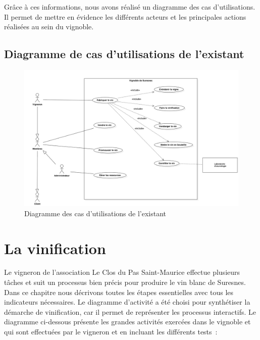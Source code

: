 \documentclass[a4paper, titlepage]{report}
\begin{document}
Grâce à ces informations, nous avons réalisé un diagramme des cas
d'utilisations. Il permet de mettre en évidence les différents acteurs
et les principales actions réalisées au sein du vignoble.

\clearpage
\subsection{Diagramme de cas d'utilisations de l'existant}

\begin{figure}[!h]
\centering
\includegraphics{Images/UseCaseDiagramExistant.jpg}
\caption{Diagramme des cas d'utilisations de l'existant}
\end{figure}

\section{La vinification}

Le vigneron de l'association Le Clos du Pas Saint-Maurice effectue
plusieurs tâches et suit un processus bien précis pour produire le vin
blanc de Suresnes. Dans ce chapitre nous décrivons toutes les étapes
essentielles avec tous les indicateurs nécessaires. Le diagramme
d'activité a été choisi pour synthétiser la démarche de vinification,
car il permet de représenter les processus interactifs. Le diagramme
ci-dessous présente les grandes activités exercées dans le vignoble et
qui sont effectuées par le vigneron et en incluant les différents
tests~:
\end{document}
